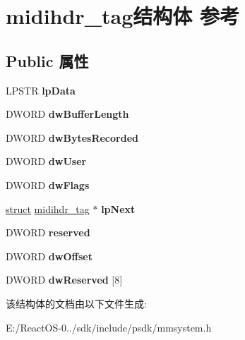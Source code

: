 \hypertarget{structmidihdr__tag}{}\section{midihdr\+\_\+tag结构体 参考}
\label{structmidihdr__tag}
\subsection*{Public 属性}
\begin{DoxyCompactItemize}
\item 
\mbox{\label{structmidihdr__tag_acb1c532873a6e2484f116b83d1a01773}} 
L\+P\+S\+TR {\bfseries lp\+Data}
\item 
\mbox{\label{structmidihdr__tag_a257daa5cd30f561c699118123729f51b}} 
D\+W\+O\+RD {\bfseries dw\+Buffer\+Length}
\item 
\mbox{\label{structmidihdr__tag_a4fbf1e2b5bf6b245982a190db62c318b}} 
D\+W\+O\+RD {\bfseries dw\+Bytes\+Recorded}
\item 
\mbox{\label{structmidihdr__tag_a31c8a8ba7fda90855f7469c67bdb55d2}} 
D\+W\+O\+RD {\bfseries dw\+User}
\item 
\mbox{\label{structmidihdr__tag_a3d53485bebb3f135fd6f96a041590cdf}} 
D\+W\+O\+RD {\bfseries dw\+Flags}
\item 
\mbox{\label{structmidihdr__tag_a3980a07677bbf2dba26c442cf4a35aab}} 
\hyperlink{interfacestruct}{struct} \hyperlink{structmidihdr__tag}{midihdr\+\_\+tag} $\ast$ {\bfseries lp\+Next}
\item 
\mbox{\label{structmidihdr__tag_a1fd6975d31eac974c4eb7afc965cfc19}} 
D\+W\+O\+RD {\bfseries reserved}
\item 
\mbox{\label{structmidihdr__tag_a273aef89e4ef15854e566aa3d180ad4e}} 
D\+W\+O\+RD {\bfseries dw\+Offset}
\item 
\mbox{\label{structmidihdr__tag_a240558b09363857fde03c73bdd5f2997}} 
D\+W\+O\+RD {\bfseries dw\+Reserved} \mbox{[}8\mbox{]}
\end{DoxyCompactItemize}


该结构体的文档由以下文件生成\+:\begin{DoxyCompactItemize}
\item 
E\+:/\+React\+O\+S-\/0../sdk/include/psdk/mmsystem.\+h\end{DoxyCompactItemize}
